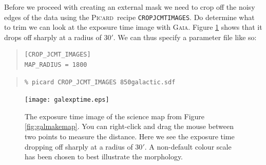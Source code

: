 \documentclass[twoside,11pt]{article}
\newcounter{box}
\newcommand{\xref}[3]{#1}
\renewcommand{\_}{\texttt{\symbol{95}}}
\newenvironment{myquote}{\begin{quote}\begin{small}}{\end{small}\end{quote}}
\newcommand{\gaia}{\xref{\textsc{Gaia}}{sun214}{}}
\newcommand{\picard}{\xref{\textsc{Picard}}{sun265}{}}
\newcommand{\drrecipe}[1]{\texttt{#1}}
\begin{document}
%
%
%



Before we proceed with creating an external mask we need to crop off the noisy edges of the data using the \picard\ recipe \drrecipe{CROP\_JCMT\_IMAGES}. Do determine what to trim we can look at the exposure time image with \gaia. Figure \ref{fig:exptime} shows that it drops off sharply at a radius of 30$'$. We can thus specify a parameter file like so:
\begin{myquote}
\begin{verbatim}
[CROP_JCMT_IMAGES]
MAP_RADIUS = 1800
\end{verbatim}
\end{myquote}

\begin{myquote}
\begin{verbatim}
% picard CROP_JCMT_IMAGES 850galactic.sdf
\end{verbatim}
\end{myquote}


\begin{figure}[th!]
\begin{center}
\texttt{[image: gal\_exptime.eps]}
\caption{\small The exposure time image of the science map from Figure \ref{fig:galmakemap}. You can right-click and drag the mouse between two points to measure the distance. Here we see the exposure time dropping off sharply at a radius of 30$'$. A non-default colour scale has been chosen to best illustrate the morphology.}
\label{fig:exptime}
\end{center}
\end{figure}
\end{document}

